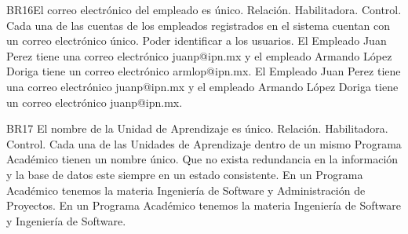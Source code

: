 \begin{BussinesRule}{BR16}{El correo electrónico del empleado es único.}
    \BRitem[Tipo: ]Relación.
    \BRitem[Clase: ]Habilitadora.
    \BRitem[Nivel: ]Control.
    \BRitem[Descripción:] Cada una de las cuentas de los empleados registrados en el sistema cuentan con un correo electrónico único.
    \BRitem[Motivación: ]Poder identificar a los usuarios.
     El Empleado Juan Perez tiene una correo electrónico juanp@ipn.mx  y el empleado Armando López Doriga tiene un correo electrónico armlop@ipn.mx.
     El Empleado Juan Perez tiene una correo electrónico juanp@ipn.mx  y el empleado Armando López Doriga tiene un correo electrónico juanp@ipn.mx.
\end{BussinesRule}
\begin{BussinesRule}{BR17} {El nombre de la Unidad de Aprendizaje es único.}
    \BRitem[Tipo: ]Relación.
    \BRitem[Clase: ]Habilitadora.
    \BRitem[Nivel: ]Control.
    \BRitem[Descripción: ]Cada  una de las Unidades de Aprendizaje dentro de un mismo Programa Académico tienen un nombre único.
    \BRitem[Motivación: ] Que no exista redundancia en la información y la base de datos este siempre en un estado consistente.
     En un Programa Académico  tenemos la materia Ingeniería de Software y Administración de Proyectos.
    En un Programa Académico  tenemos la materia Ingeniería de Software y  Ingeniería de Software.
\end{BussinesRule}
